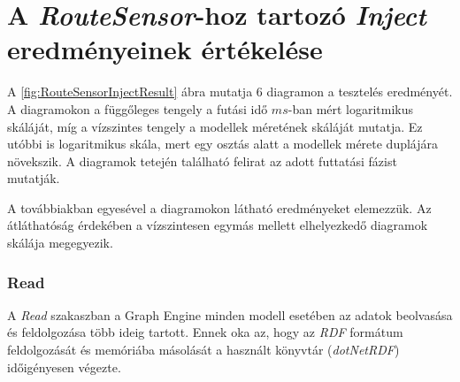 \section{A \emph{RouteSensor}-hoz tartozó \emph{Inject} eredményeinek értékelése}

A \ref{fig:RouteSensorInjectResult} ábra mutatja 6 diagramon a tesztelés eredményét. A diagramokon a függőleges tengely a futási idő $ms$-ban mért logaritmikus skáláját, míg a vízszintes tengely a modellek méretének skáláját mutatja. Ez utóbbi is logaritmikus skála, mert egy osztás alatt a modellek mérete duplájára növekszik. A diagramok tetején található felirat az adott futtatási fázist mutatják.

A továbbiakban egyesével a diagramokon látható eredményeket elemezzük. Az átláthatóság érdekében a vízszintesen egymás mellett elhelyezkedő diagramok skálája megegyezik.

\subsubsection{Read}

A \emph{Read} szakaszban a Graph Engine minden modell esetében az adatok beolvasása és feldolgozása több ideig tartott. Ennek oka az, hogy az \emph{RDF} formátum feldolgozását és memóriába másolását a használt könyvtár (\emph{dotNetRDF}) időigényesen végezte.

